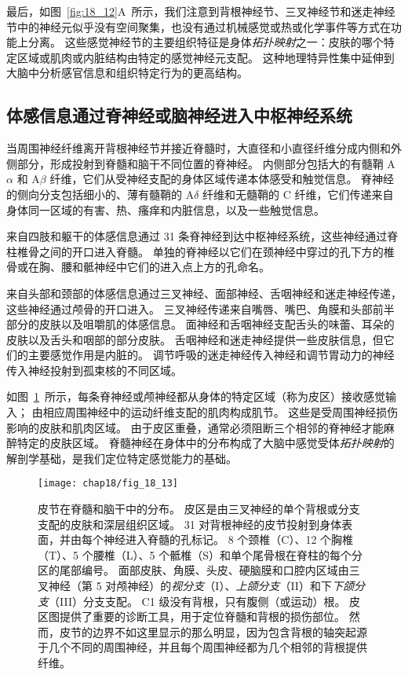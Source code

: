 最后，如图~\ref{fig:18_12}A~所示，我们注意到背根神经节、三叉神经节和迷走神经节中的神经元似乎没有空间聚集，也没有通过机械感觉或热或化学事件等方式在功能上分离。
这些感觉神经节的主要组织特征是身体\textit{拓扑映射}之一：皮肤的哪个特定区域或肌肉或内脏结构由特定的感觉神经元支配。
这种地理特异性集中延伸到大脑中分析感官信息和组织特定行为的更高结构。



\subsection{体感信息通过脊神经或脑神经进入中枢神经系统}

当周围神经纤维离开背根神经节并接近脊髓时，大直径和小直径纤维分成内侧和外侧部分，形成投射到脊髓和脑干不同位置的脊神经。
内侧部分包括大的有髓鞘 A$\alpha$ 和 A$\beta$ 纤维，它们从受神经支配的身体区域传递本体感受和触觉信息。
脊神经的侧向分支包括细小的、薄有髓鞘的 A$\delta$ 纤维和无髓鞘的 C 纤维，它们传递来自身体同一区域的有害、热、瘙痒和内脏信息，以及一些触觉信息。


来自四肢和躯干的体感信息通过 31 条脊神经到达中枢神经系统，这些神经通过脊柱椎骨之间的开口进入脊髓。 
单独的脊神经以它们在颈神经中穿过的孔下方的椎骨或在胸、腰和骶神经中它们的进入点上方的孔命名。


来自头部和颈部的体感信息通过三叉神经、面部神经、舌咽神经和迷走神经传递，这些神经通过颅骨的开口进入。 
三叉神经传递来自嘴唇、嘴巴、角膜和头部前半部分的皮肤以及咀嚼肌的体感信息。
面神经和舌咽神经支配舌头的味蕾、耳朵的皮肤以及舌头和咽部的部分皮肤。
舌咽神经和迷走神经提供一些皮肤信息，但它们的主要感觉作用是内脏的。
调节呼吸的迷走神经传入神经和调节胃动力的神经传入神经投射到孤束核的不同区域。


如图~\ref{fig:18_13}~所示，每条脊神经或颅神经都从身体的特定区域（称为皮区）接收感觉输入；
由相应周围神经中的运动纤维支配的肌肉构成肌节。
这些是受周围神经损伤影响的皮肤和肌肉区域。
由于皮区重叠，通常必须阻断三个相邻的脊神经才能麻醉特定的皮肤区域。
脊髓神经在身体中的分布构成了大脑中感觉受体\textit{拓扑映射}的解剖学基础，是我们定位特定感觉能力的基础。


\begin{figure}[htbp]
	\centering
	\texttt{[image: chap18/fig\_18\_13]}
	\caption{皮节在脊髓和脑干中的分布。 
		皮区是由三叉神经的单个背根或分支支配的皮肤和深层组织区域。 
		31 对背根神经的皮节投射到身体表面，并由每个神经进入脊髓的孔标记。 
		8 个颈椎（C）、12 个胸椎（T）、5 个腰椎（L）、5 个骶椎（S）和单个尾骨根在脊柱的每个分区的尾部编号。 
		面部皮肤、角膜、头皮、硬脑膜和口腔内区域由三叉神经（第 5 对颅神经）的\textit{视分支}（I）、\textit{上颌分支}（II）和下\textit{下颌分支}（III）分支支配。
		C1 级没有背根，只有腹侧（或运动）根。 
		皮区图提供了重要的诊断工具，用于定位脊髓和背根的损伤部位。 
		然而，皮节的边界不如这里显示的那么明显，因为包含背根的轴突起源于几个不同的周围神经，并且每个周围神经都为几个相邻的背根提供纤维。}
	\label{fig:18_13}
\end{figure}


